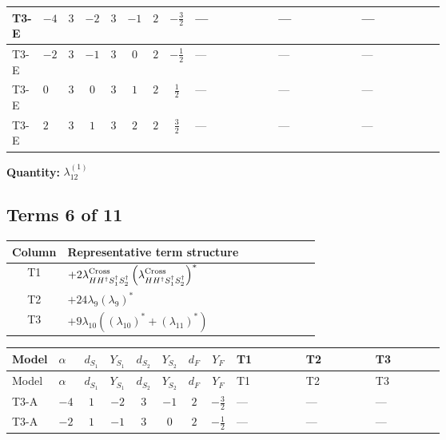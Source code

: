 \documentclass[8pt]{article}
\begin{document}
\begin{landscape}
\begin{longtable}{@{}llcccccc >{\raggedright\arraybackslash}p{0.21\linewidth} >{\raggedright\arraybackslash}p{0.21\linewidth} >{\raggedright\arraybackslash}p{0.21\linewidth}@{}}
\midrule
T3-E & $-4$ & $3$ & $-2$ & $3$ & $-1$ & $2$ & $-\frac{3}{2}$ & --- & --- & --- \\
\midrule
T3-E & $-2$ & $3$ & $-1$ & $3$ & $0$ & $2$ & $-\frac{1}{2}$ & --- & --- & --- \\
\midrule
T3-E & $0$ & $3$ & $0$ & $3$ & $1$ & $2$ & $\frac{1}{2}$ & --- & --- & --- \\
\midrule
T3-E & $2$ & $3$ & $1$ & $3$ & $2$ & $2$ & $\frac{3}{2}$ & --- & --- & --- \\
\midrule
\bottomrule
\end{longtable}
\clearpage
\noindent\textbf{Quantity: }$\lambda_{12}^{(1)}$\par\smallskip
\subsection*{Terms 6 of 11}
\begin{center}
\begin{tabular}{@{}c >{\raggedright\arraybackslash}p{0.82\linewidth}@{}}
\toprule
Column & Representative term structure \\
\midrule
T1 & \(\displaystyle +2 {\lambda_{H H^\dagger S_1^\dagger S_2^\dagger}^{\rm Cross}} \left({\lambda_{H H^\dagger S_1^\dagger S_2^\dagger}^{\rm Cross}}\right)^{*}\) \\
\midrule
T2 & \(\displaystyle +24 {\lambda_{9}} \left({\lambda_{9}}\right)^{*}\) \\
\midrule
T3 & \(\displaystyle +9 {\lambda_{10}} (\left({\lambda_{10}}\right)^{*}+\left({\lambda_{11}}\right)^{*})\) \\
\midrule
\bottomrule
\end{tabular}
\end{center}
\smallskip
\tiny
\begin{longtable}{@{}llcccccc >{\raggedright\arraybackslash}p{0.21\linewidth} >{\raggedright\arraybackslash}p{0.21\linewidth} >{\raggedright\arraybackslash}p{0.21\linewidth}@{}}
\toprule
Model & $\alpha$ & $d_{S_1}$ & $Y_{S_1}$ & $d_{S_2}$ & $Y_{S_2}$ & $d_F$ & $Y_F$ & T1 & T2 & T3 \\
\midrule
\endfirsthead
\toprule
Model & $\alpha$ & $d_{S_1}$ & $Y_{S_1}$ & $d_{S_2}$ & $Y_{S_2}$ & $d_F$ & $Y_F$ & T1 & T2 & T3 \\
\midrule
\endhead
T3-A & $-4$ & $1$ & $-2$ & $3$ & $-1$ & $2$ & $-\frac{3}{2}$ & --- & --- & --- \\
\midrule
T3-A & $-2$ & $1$ & $-1$ & $3$ & $0$ & $2$ & $-\frac{1}{2}$ & --- & --- & --- \\

\end{longtable}
\end{landscape}
\end{document}
